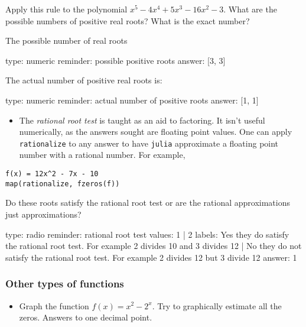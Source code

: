 \documentclass[12pt]{article}
\begin{document}
Apply this rule to the polynomial $x^5 - 4x^4 + 5x^3 - 16x^2 -   3$.
What are the possible numbers of positive real roots? What is the exact
number?

The possible number of real roots

\begin{answer}
    type: numeric
    reminder: possible positive roots
    answer: [3, 3]

\end{answer}

The actual number of positive real roots is:

\begin{answer}
    type: numeric
    reminder: actual number of positive roots
    answer: [1, 1]

\end{answer}

\begin{itemize}
\itemsep1pt\parskip0pt
\item
  The \emph{rational root test} is taught as an aid to factoring. It
  isn't useful numerically, as the answers sought are floating point
  values. One can apply \texttt{rationalize} to any answer to have
  \texttt{julia} approximate a floating point number with a rational
  number. For example,
\end{itemize}



\begin{verbatim}
f(x) = 12x^2 - 7x - 10
map(rationalize, fzeros(f))
\end{verbatim}
Do these roots satisfy the rational root test or are the rational
approximations just approximations?

\begin{answer}
type: radio
reminder: rational root test
values: 1 | 2
labels: Yes they do satisfy the rational root test. For example 2 divides 10 and 3 divides 12 | No they do not satisfy the rational root test. For example 2 divides 12 but 3  divide 12
answer: 1
\end{answer}

\subsubsection{Other types of functions}

\begin{itemize}
\itemsep1pt\parskip0pt
\item
  Graph the function $f(x)= x^2 - 2^x$. Try to graphically estimate all
  the zeros. Answers to one decimal point.
\end{itemize}
\end{document}
